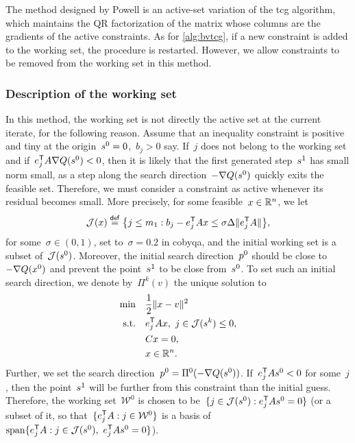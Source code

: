 The method designed by Powell is an active-set variation of the \gls{tcg} algorithm, which maintains the QR factorization of the matrix whose columns are the gradients of the active constraints.
As for \cref{alg:bvtcg}, if a new constraint is added to the working set, the procedure is restarted.
However, we allow constraints to be removed from the working set in this method.

\subsubsection{Description of the working set}

In this method, the working set is not directly the active set at the current iterate, for the following reason.
Assume that an inequality constraint is positive and tiny at the origin~$\sstep[0] = 0$,~$b_j > 0$ say.
If~$j$ does not belong to the working set and if~$e_j^{\T} A \nabla Q(\sstep[0]) < 0$, then it is likely that the first generated step~$\sstep[1]$ has small norm small, as a step along the search direction~$-\nabla Q(\sstep[0])$ quickly exits the feasible set.
Therefore, we must consider a constraint as active whenever its residual becomes small.
More precisely, for some feasible~$\iter \in \R^n$, we let
\begin{equation*}
    \mathcal{J}(\iter) \eqdef \set[\big]{j \le m_1 : b_j - e_j^{\T} A \iter \le \sigma \rad \norm{e_j^{\T} A}},
\end{equation*}
for some~$\sigma \in (0, 1)$, set to~$\sigma = 0.2$ in \gls{cobyqa}, and the initial working set is a subset of~$\mathcal{J}(\sstep[0])$.
Moreover, the initial search direction~$\pstep[0]$ should be close to~$-\nabla Q(\iter[0])$ and prevent the point~$\sstep[1]$ to be close from~$\sstep[0]$.
To set such an initial search direction, we denote by~$\Pi^k(v)$ the unique solution to
\begin{subequations}
    \label{eq:tcg-linear-working-set}
    \begin{align}
        \min        & \quad \frac{1}{2} \norm{\iter - v}^2\\
        \text{s.t.} & \quad e_j^{\T} A \iter, ~ j \in \mathcal{J}(\sstep[k]) \le 0,\\
                    & \quad C \iter = 0,\\
                    & \quad \iter \in \R^n. \nonumber
    \end{align}
\end{subequations}
Further, we set the search direction~$\pstep[0] = \Pi^0(-\nabla Q(\sstep[0]))$.
If~$e_j^{\T} A \sstep[0] < 0$ for some~$j$, then the point~$\sstep[1]$ will be further from this constraint than the initial guess.
Therefore, the working set~$\mathcal{W}^0$ is chosen to be~$\set{j \in \mathcal{J}(\sstep[0]) : e_j^{\T} A \sstep[0] = 0}$ (or a subset of it, so that~$\{e_j^{\mathsf{T}} A : j \in \mathcal{W}^0\}$ is a basis of~$\vspan \set{e_j^{\T} A : j \in \mathcal{J}(\sstep[0]), ~ e_j^{\T} A \sstep[0] = 0}$).


